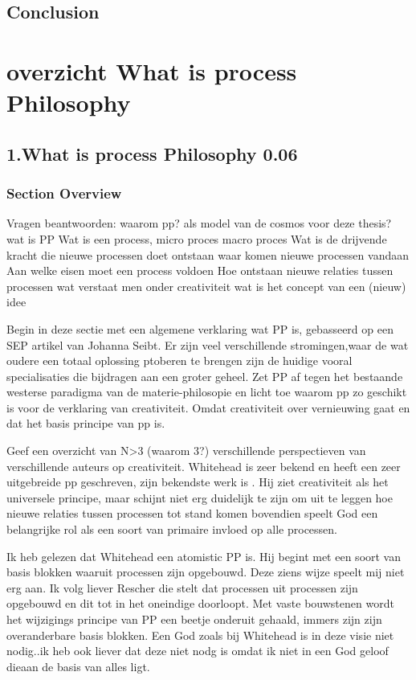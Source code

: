 \documentclass[a4paper]{Thesis}
\begin{document}
\section{Conclusion}
\chapter{overzicht What is process Philosophy}

\section{1.What is process Philosophy 0.06}
\subsection{Section Overview}
Vragen beantwoorden:
waarom pp? als model van de cosmos voor deze thesis?
wat is PP
Wat is een process, micro proces macro proces
Wat is de drijvende kracht die nieuwe processen doet ontstaan
waar komen nieuwe processen vandaan
Aan welke eisen moet een process voldoen
Hoe ontstaan nieuwe relaties tussen processen
wat verstaat men onder creativiteit
wat is het concept van een (nieuw) idee

Begin in deze sectie met een algemene verklaring wat PP is, gebasseerd op een SEP artikel van Johanna Seibt. Er zijn veel verschillende stromingen,waar de wat oudere een totaal oplossing ptoberen te brengen zijn de huidige vooral specialisaties die bijdragen aan een groter geheel.
Zet PP af tegen het bestaande westerse paradigma van de materie-philosopie en licht toe waarom pp zo geschikt is voor de verklaring van creativiteit. Omdat creativiteit over vernieuwing gaat en dat het basis principe van pp is.

Geef een overzicht van N>3 (waarom 3?) verschillende perspectieven van verschillende auteurs op creativiteit. Whitehead is zeer bekend en heeft een zeer uitgebreide pp geschreven, zijn bekendste werk is \cite{whitehead1929process}. Hij ziet creativiteit als het universele principe, maar schijnt niet erg duidelijk te zijn om uit te leggen hoe nieuwe relaties tussen processen tot stand komen bovendien speelt God een belangrijke rol als een soort van primaire invloed op alle processen.

Ik heb gelezen dat Whitehead een atomistic PP is. Hij begint met een soort van basis blokken waaruit processen zijn opgebouwd. Deze ziens wijze speelt mij niet erg aan. Ik volg liever Rescher die stelt dat processen uit processen zijn opgebouwd en dit tot in het oneindige doorloopt. Met vaste bouwstenen wordt het wijzigings principe van PP een beetje onderuit gehaald, immers zijn zijn overanderbare basis blokken. Een God zoals bij Whitehead is in deze visie niet nodig..ik heb ook liever dat deze niet nodg is omdat ik niet in een God geloof dieaan de basis van alles ligt.
\end{document}
